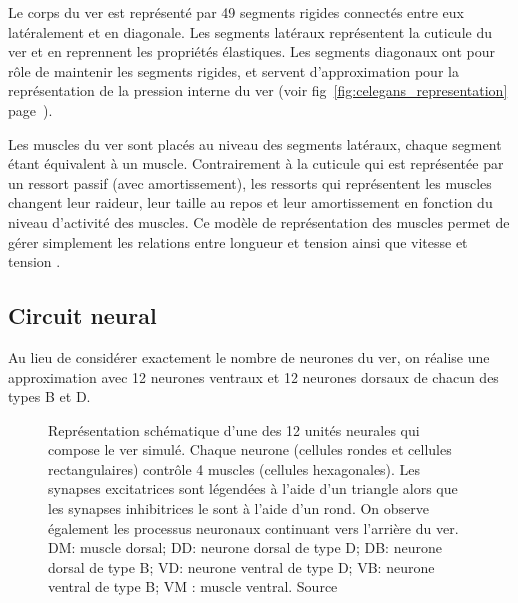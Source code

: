 Le corps du ver est représenté par 49 segments rigides connectés entre eux
latéralement et en diagonale. Les segments latéraux représentent la cuticule du
ver et en reprennent les propriétés élastiques. Les segments diagonaux ont pour
rôle de maintenir les segments rigides, et servent d'approximation pour la
représentation de la pression interne du ver (voir
fig~\ref{fig:celegans_representation}
page~\pageref{fig:celegans_representation}).

Les muscles du ver sont placés au niveau des segments latéraux, chaque segment
étant équivalent à un muscle. Contrairement à la cuticule qui est représentée par un
ressort passif (avec amortissement), les ressorts qui représentent les muscles
changent leur raideur, leur taille au repos et leur amortissement en fonction du niveau
d'activité des muscles. Ce modèle de représentation des muscles permet de gérer
simplement les relations entre longueur et tension ainsi que vitesse et tension
\cite{Boyle2009}.


\subsection{Circuit neural} %
\label{sub:Circuit neural}

Au lieu de considérer exactement le nombre de neurones du ver, on réalise une
approximation avec 12 neurones ventraux et 12 neurones dorsaux de chacun des types
B et D.

\begin{figure}[ht]
   \begin{center}
   \end{center}
   \caption[Représentation d'une unité neural de \celeg{}]{Représentation
   schématique d'une des 12 unités neurales qui compose le ver simulé. Chaque
   neurone (cellules rondes et cellules rectangulaires) contrôle 4 muscles
   (cellules hexagonales).  Les synapses excitatrices sont légendées à l'aide
   d'un triangle alors que les synapses inhibitrices le sont à l'aide d'un
   rond.  On observe également les processus neuronaux continuant vers
   l'arrière du ver.  DM: muscle dorsal; DD: neurone dorsal de type D; DB:
   neurone dorsal de type B; VD: neurone ventral de type D; VB: neurone ventral
   de type B; VM : muscle ventral.  Source \boylecite{}}
   \label{fig:celegans_segment}
\end{figure}


